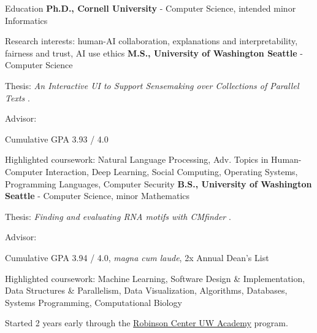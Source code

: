 \begin{rubric}{Education}
	\textbf{Ph.D., Cornell University} - Computer Science, intended minor Informatics
    \par Research interests: human-AI collaboration, explanations and interpretability, fairness and trust, AI use ethics
\entry*[2019 -- 2021] %
	\textbf{M.S., University of Washington Seattle} - Computer Science
	\par Thesis: \emph{An Interactive UI to Support Sensemaking over Collections of Parallel Texts} \cite{zhou2021thesis}.
    \par Advisor: \pWeldD{}
    \par Cumulative GPA 3.93 / 4.0
    \par Highlighted coursework: Natural Language Processing, Adv. Topics in Human-Computer Interaction, Deep Learning, Social Computing, Operating Systems, Programming Languages, Computer Security
\entry*[2016 -- 2019] %
	\textbf{B.S., University of Washington Seattle} - Computer Science, minor Mathematics
	\par Thesis: \emph{Finding and evaluating RNA motifs with CMfinder} \cite{zhou2019thesis}.
	\par Advisor: \pRuzzoL{}
	\par Cumulative GPA 3.94 / 4.0, \textit{magna cum laude}, 2x Annual Dean's List
	\par Highlighted coursework: Machine Learning, Software Design \& Implementation, Data Structures \& Parallelism, Data Visualization, Algorithms, Databases, Systems Programming, Computational Biology
	\par Started 2 years early through the \href{https://robinsoncenter.uw.edu/programs/uw-academy/}{Robinson Center UW Academy} program.
\end{rubric}
